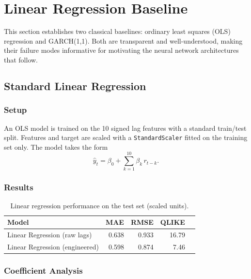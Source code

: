 \section{Linear Regression Baseline}
\label{sec:linreg}

This section establishes two classical baselines: ordinary least squares (OLS) regression
and GARCH(1,1). Both are transparent and well-understood, making their failure modes
informative for motivating the neural network architectures that follow.

\subsection{Standard Linear Regression}

\subsubsection{Setup}

An OLS model is trained on the 10 signed lag features with a standard train/test split.
Features and target are scaled with a \texttt{StandardScaler} fitted on the training set
only. The model takes the form
\[
  \hat{y}_t = \beta_0 + \sum_{k=1}^{10} \beta_k \, r_{t-k}.
\]

\subsubsection{Results}

\begin{table}[H]
  \centering
  \caption{Linear regression performance on the test set (scaled units).}
  \label{tab:linreg_full}
  \begin{tabular}{lrrrr}
    \toprule
    Model & MAE & RMSE & QLIKE \\
    \midrule
    Linear Regression (raw lags)     & 0.638 & 0.933 & 16.79 \\
    Linear Regression (engineered)   & 0.598 & 0.874 &  7.46 \\
    \bottomrule
  \end{tabular}
\end{table}

\subsubsection{Coefficient Analysis}

